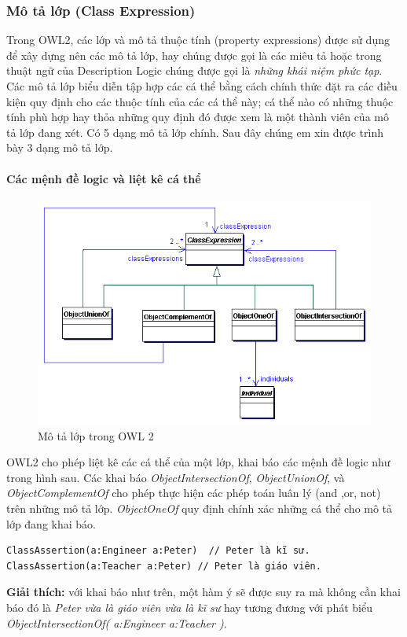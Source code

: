 \subsubsection{Mô tả lớp (Class Expression)}
Trong OWL2, các lớp và mô tả thuộc tính (property expressions) được sử dụng để xây dựng nên các mô tả lớp, hay chúng được gọi là các miêu tả hoặc trong thuật ngữ của Description Logic chúng được gọi là \textit{những khái niệm phức tạp}. Các mô tả lớp 
biểu diễn tập hợp các cá thể bằng cách chính thức đặt ra các điều kiện quy định cho các thuộc tính của các cá thể này; cá thể nào có những thuộc tính phù hợp hay thỏa những quy định đó được xem là một thành viên của mô tả lớp đang xét. Có 5 dạng mô tả lớp chính. Sau đây chúng em xin được trình bày 3 dạng mô tả lớp.
\paragraph{Các mệnh đề logic và liệt kê cá thể}
\begin{figure}[h]
	\centering
	\includegraphics[width=150mm]{Figures/ce_0.png}
	\caption{Mô tả lớp trong OWL 2\label{overflow}}
\end{figure}
OWL2 cho phép liệt kê các cá thể của một lớp, khai báo các mệnh đề logic như trong hình sau. Các khai báo \textit{ObjectIntersectionOf}, \textit{ObjectUnionOf}, và \textit{ObjectComplementOf} cho phép thực hiện các phép toán luân lý (and ,or, not) trên những mô tả lớp. \textit{ObjectOneOf} quy định chính xác những cá thể cho mô tả lớp đang khai báo.

\begin{verbatim}
ClassAssertion(a:Engineer a:Peter)  // Peter là kĩ sư.
ClassAssertion(a:Teacher a:Peter) // Peter là giáo viên.
\end{verbatim}
\textbf{Giải thích: } với khai báo như trên, một hàm ý sẽ được suy ra mà không cần khai báo đó là \textit{Peter vừa là giáo viên vừa là kĩ sư} hay tương đương với phát biểu \textit{ObjectIntersectionOf( a:Engineer a:Teacher )}. 

